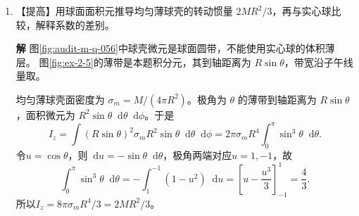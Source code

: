 \documentclass[11pt,openany,fontset=fandol]{ctexbook}
\theoremstyle{plain}\newtheorem{theorem}{定理}[chapter]\newtheorem{proposition}[theorem]{命题}
\theoremstyle{definition}\newtheorem{definition}{定义}[chapter]\newtheorem{example}{例}[chapter]
\theoremstyle{remark}\newtheorem*{remark}{说明}
\newcommand{\SolutionStart}{\par\nobreak\medskip\nobreak\noindent\textbf{解}\quad\ignorespaces}
\newenvironment{solution}{\SolutionStart}{\par\medskip}
\newcommand{\dd}{\mathop{}\!\mathrm d}\newcommand{\ii}{\mathrm i}\newcommand{\ee}{\mathrm e}
\newcommand{\vct}[1]{\bm{#1}}\newcommand{\Rea}{\operatorname{Re}}\newcommand{\Ima}{\operatorname{Im}}
\begin{document}
\begin{enumerate}[label=2.\arabic*]
\begin{solution}
设 $a,b>0,t>0$。极坐标速度两分量为 $v_r=\dot r=a$、$v_\theta=r\dot\theta=abt$，因此
\[
v=\sqrt{v_r^2+v_\theta^2}=a\sqrt{1+b^2t^2}.
\]
相对原点的角动量 $L_z=mr^2\dot\theta=ma^2bt^2$，面积速度为 $\dot S=r^2\dot\theta/2=a^2bt^2/2$。由角动量定理，
\[
\dot L_z=2ma^2bt=rF_\theta,
\qquad F_\theta=2mab.
\]
直接用极坐标加速度也得到 $a_\theta=r\ddot\theta+2\dot r\dot\theta=2ab$，两法一致。面积速度不恒定，故该运动不只受相对原点的中心力控制。

\begin{figure}[H]\centering
{}
\caption{题2.4：极坐标基矢与螺线轨迹示意；$\vct e_r$ 沿径向，$\vct e_\theta$ 沿角度增大方向。}\label{fig:ex-2-4}
\end{figure}

图中的横向分量 $r\dot\theta$ 随时间增加，故角动量不恒定，必须有非零横向力矩。
\end{solution}

\item \begin{minipage}[t]{\linewidth}
【提高】用球面面积元推导均匀薄球壳的转动惯量 $2MR^2/3$，再与实心球比较，解释系数的差别。

\end{minipage}

\begin{solution}
图\ref{fig:audit-m-q-056}中球壳微元是球面圆带，不能使用实心球的体积薄层。
图\ref{fig:ex-2-5}的薄带是本题积分元，其到轴距离为 $R\sin\theta$，带宽沿子午线量取。

均匀薄球壳面密度为 $\sigma_m=M/(4\pi R^2)$。极角为 $\theta$ 的薄带到轴距离为 $R\sin\theta$，面积微元为 $R^2\sin\theta\dd\theta\dd\phi$。于是
\[
I_z=\int(R\sin\theta)^2\sigma_mR^2\sin\theta\dd\theta\dd\phi
=2\pi\sigma_mR^4\int_0^\pi\sin^3\theta\dd\theta.
\]
令$u=\cos\theta$，则$\dd u=-\sin\theta\dd\theta$，极角两端对应$u=1,-1$，故
\[\int_0^\pi\sin^3\theta\dd\theta
=-\int_1^{-1}(1-u^2)\dd u
=\left[u-\frac{u^3}{3}\right]_{-1}^1=\frac43.\]
所以$I_z=8\pi\sigma_mR^4/3=2MR^2/3$。


\end{solution}
\end{enumerate}
\end{document}
